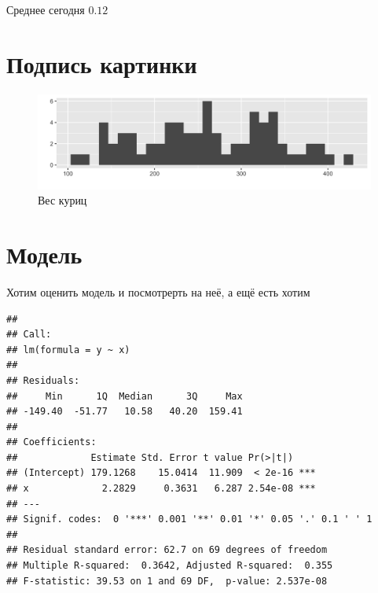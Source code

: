 \documentclass{article}\usepackage[]{graphicx}\usepackage[]{color}
\makeatletter
\def\maxwidth{ %
  \ifdim\Gin@nat@width>\linewidth
    \linewidth
  \else
    \Gin@nat@width
  \fi
}
\newenvironment{kframe}{%
 \def\at@end@of@kframe{}%
 \ifinner\ifhmode%
  \def\at@end@of@kframe{\end{minipage}}%
  \begin{minipage}{\columnwidth}%
 \fi\fi%
 \def\FrameCommand##1{\hskip\@totalleftmargin \hskip-\fboxsep
 \colorbox{shadecolor}{##1}\hskip-\fboxsep
     \hskip-\linewidth \hskip-\@totalleftmargin \hskip\columnwidth}%
 \MakeFramed {\advance\hsize-\width
   \@totalleftmargin\z@ \linewidth\hsize
   \@setminipage}}%
 {\par\unskip\endMakeFramed%
 \at@end@of@kframe}
\newenvironment{knitrout}{}{} %
\makeatother
\begin{document}
Среднее сегодня $0.12$


\section{Подпись картинки}

\begin{figure}[H]
\begin{knitrout}
\color{fgcolor}

{\centering \includegraphics[width=\maxwidth]{figure/unnamed-chunk-5-1} 

}



\end{knitrout}
\caption{Вес куриц}
\end{figure}

\section{Модель}

Хотим оценить модель и посмотрерть на неё, а ещё есть хотим

\begin{knitrout}
\color{fgcolor}\begin{kframe}
\begin{verbatim}
## 
## Call:
## lm(formula = y ~ x)
## 
## Residuals:
##     Min      1Q  Median      3Q     Max 
## -149.40  -51.77   10.58   40.20  159.41 
## 
## Coefficients:
##             Estimate Std. Error t value Pr(>|t|)    
## (Intercept) 179.1268    15.0414  11.909  < 2e-16 ***
## x             2.2829     0.3631   6.287 2.54e-08 ***
## ---
## Signif. codes:  0 '***' 0.001 '**' 0.01 '*' 0.05 '.' 0.1 ' ' 1
## 
## Residual standard error: 62.7 on 69 degrees of freedom
## Multiple R-squared:  0.3642,	Adjusted R-squared:  0.355 
## F-statistic: 39.53 on 1 and 69 DF,  p-value: 2.537e-08
\end{verbatim}
\end{kframe}
\end{knitrout}
\end{document}
